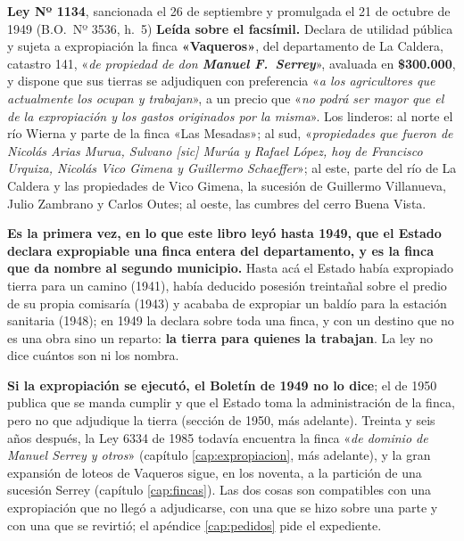 \begin{ficha}{\textbf{Ley Nº 1134}, sancionada el 26 de septiembre y promulgada el 21 de octubre de 1949 (B.O.\ Nº 3536, h.\ 5)}
\textbf{Leída sobre el facsímil.} Declara de utilidad pública y sujeta a expropiación la finca
\textbf{«Vaqueros»}, del departamento de La Caldera, catastro 141, «\textit{de propiedad de don
\textbf{Manuel F.\ Serrey}}», avaluada en \textbf{\$300.000}, y dispone que sus tierras se adjudiquen
con preferencia «\textit{a los agricultores que actualmente los ocupan y trabajan}», a un precio
que «\textit{no podrá ser mayor que el de la expropiación y los gastos originados por la misma}». Los linderos: al norte el río Wierna y
parte de la finca «Las Mesadas»; al sud, «\textit{propiedades que fueron de Nicolás Arias Murua,
Sulvano [sic] Murúa y Rafael López, hoy de Francisco Urquiza, Nicolás Vico Gimena y Guillermo
Schaeffer}»; al este, parte del río de La Caldera y las propiedades de Vico Gimena, la sucesión de
Guillermo Villanueva, Julio Zambrano y Carlos Outes; al oeste, las cumbres del cerro Buena Vista.
\end{ficha}

\begin{cautela}
\textbf{Es la primera vez, en lo que este libro leyó hasta 1949, que el Estado declara
expropiable una finca entera del departamento, y es la finca que da nombre al segundo municipio.} Hasta acá el Estado había
expropiado tierra para un camino (1941), había deducido posesión treintañal sobre el predio de su
propia comisaría (1943) y acababa de expropiar un baldío para la estación sanitaria (1948); en 1949
la declara sobre toda una finca, y con un destino que no es una obra sino un reparto: \textbf{la
tierra para quienes la trabajan}. La ley no dice cuántos son ni los nombra.

\textbf{Si la expropiación se ejecutó, el Boletín de 1949 no lo dice}; el de 1950 publica que se
manda cumplir y que el Estado toma la administración de la finca, pero no que adjudique la tierra
(sección de 1950, más adelante). Treinta y seis años
después, la Ley 6334 de 1985 todavía encuentra la finca «\textit{de dominio de Manuel Serrey y
otros}» (capítulo \ref{cap:expropiacion}, más adelante), y la gran expansión de loteos de Vaqueros sigue, en los noventa, a
la partición de una sucesión Serrey (capítulo \ref{cap:fincas}). Las dos cosas son compatibles con
una expropiación que no llegó a adjudicarse, con una que se hizo sobre una parte y con una que se revirtió; el
apéndice \ref{cap:pedidos} pide el expediente.
\end{cautela}

